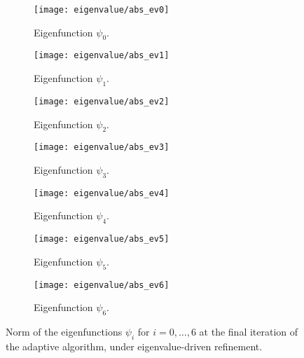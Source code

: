 \documentclass[12pt]{amsart}
\begin{document}
\begin{figure}[htbp]
    \begin{subfigure}[t]{0.49\textwidth}
        \centering
        \texttt{[image: eigenvalue/abs\_ev0]}
        \caption{Eigenfunction \(\psi_0\).}
        \label{fig:eigenfunction_0}
    \end{subfigure}
    \begin{subfigure}[t]{0.49\textwidth}
        \centering
        \texttt{[image: eigenvalue/abs\_ev1]}
        \caption{Eigenfunction \(\psi_1\).}
        \label{fig:eigenfunction_1}
    \end{subfigure}
    \vspace{1cm}
    \begin{subfigure}[t]{0.49\textwidth}
        \centering
        \texttt{[image: eigenvalue/abs\_ev2]}
        \caption{Eigenfunction \(\psi_2\).}
        \label{fig:eigenfunction_2}
    \end{subfigure}
    \begin{subfigure}[t]{0.49\textwidth}
        \centering
        \texttt{[image: eigenvalue/abs\_ev3]}
        \caption{Eigenfunction \(\psi_3\).}
        \label{fig:eigenfunction_3}
    \end{subfigure}
    \vspace{1cm}
    \begin{subfigure}[t]{0.49\textwidth}
        \centering
        \texttt{[image: eigenvalue/abs\_ev4]}
        \caption{Eigenfunction \(\psi_4\).}
        \label{fig:eigenfunction_4}
    \end{subfigure}
    \begin{subfigure}[t]{0.49\textwidth}
        \centering
        \texttt{[image: eigenvalue/abs\_ev5]}
        \caption{Eigenfunction \(\psi_5\).}
        \label{fig:eigenfunction_5}
    \end{subfigure}
    \vspace{1cm}
    \begin{subfigure}[t]{0.49\textwidth}
        \centering
        \texttt{[image: eigenvalue/abs\_ev6]}
        \caption{Eigenfunction \(\psi_6\).}
        \label{fig:eigenfunction_6}
    \end{subfigure}
    \caption{Norm of the eigenfunctions \(\psi_i\) for \(i = 0, \ldots, 6\) at the final iteration of the adaptive algorithm, under eigenvalue-driven refinement.}
\end{figure}
\end{document}
